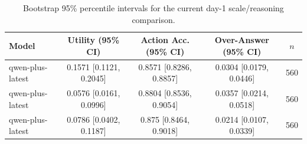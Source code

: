 \begin{table}[t]
\centering
\small
\setlength{\tabcolsep}{4.0pt}
\begin{tabular}{lcccc}
\toprule
Model & Utility (95\% CI) & Action Acc. (95\% CI) & Over-Answer (95\% CI) & $n$ \\
\midrule
qwen-plus-latest & 0.1571 [0.1121, 0.2045] & 0.8571 [0.8286, 0.8857] & 0.0304 [0.0179, 0.0446] & 560 \\
qwen-plus-latest & 0.0576 [0.0161, 0.0996] & 0.8804 [0.8536, 0.9054] & 0.0357 [0.0214, 0.0518] & 560 \\
qwen-plus-latest & 0.0786 [0.0402, 0.1187] & 0.875 [0.8464, 0.9018] & 0.0214 [0.0107, 0.0339] & 560 \\
\bottomrule
\end{tabular}
\caption{Bootstrap 95\% percentile intervals for the current day-1 scale/reasoning comparison.}
\label{tab:day1-scale-reasoning-ci-main}
\end{table}
